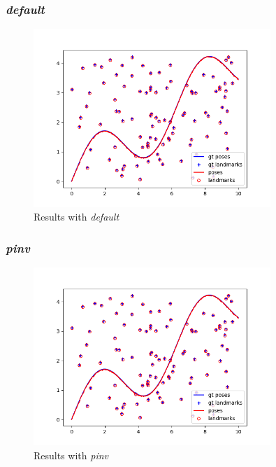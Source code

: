 \documentclass[12pt, a4paper]{article}
\begin{document}
\subsubsection{\textit{default}}
\begin{figure}[H]
  \centering
  \includegraphics[width=0.8\textwidth]{./results/linear/default_2d_linear_map.png}
  \caption{Results with \textit{default}}
\end{figure}
\subsubsection{\textit{pinv}}
\begin{figure}[H]
  \centering
  \includegraphics[width=0.8\textwidth]{./results/linear/pinv_2d_linear_map.png}
  \caption{Results with \textit{pinv}}
\end{figure}
\end{document}
